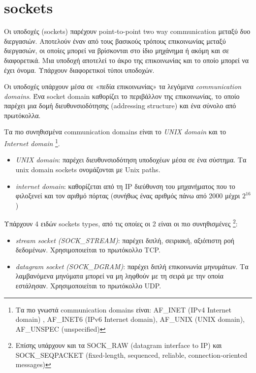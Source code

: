 


\section*{sockets}

Οι υποδοχές (sockets) παρέχουν point-to-point two way communication μεταξύ δυο διεργασιών. Αποτελούν έναν από τους βασικούς τρόπους
επικοινωνίας μεταξύ διεργασιών, οι οποίες μπορεί να βρίσκονται στο ίδιο μηχάνημα ή ακόμη και σε διαφορετικά. Μια υποδοχή αποτελεί το άκρο
της επικοινωνίας και το οποίο μπορεί να έχει όνομα. Υπάρχουν διαφορετικοί τύποι υποδοχών.

Οι υποδοχές υπάρχουν μέσα σε «πεδία επικοινωνίας» τα λεγόμενα \emph{communication domains}. Ένα socket domain καθορίζει το περιβάλλον της
επικοινωνίας, το οποίο παρέχει μια δομή διευθυνσιοδότησης (addressing structure) και ένα σύνολο από πρωτόκολλα.

Τα πιο συνηθισμένα communication domains είναι το \emph{UNIX domain} και το \emph{Internet domain} \footnote{Τα πιο γνωστά communication
	domains είναι: AF\_INET (IPv4 Internet domain) , AF\_INET6 (IPv6 Internet domain), AF\_UNIX (UNIX domain), AF\_UNSPEC (unspecified)}.

\begin{itemize}
	\item \emph{UNIX domain}: παρέχει διευθυνσιοδότηση υποδοχέων μέσα σε ένα σύστημα. Τα unix domain sockets ονομάζονται με Unix paths. 
	\item \emph{internet domain}: καθορίζεται από τη IP διεύθυνση του μηχανήματος που το φιλοξενεί και τον αριθμό πόρτας (συνήθως ένας αριθμός
	πάνω από 2000 μέχρι $2^{16}$) 
\end{itemize}

Υπάρχουν 4 ειδών sockets types, από τις οποίες οι 2 είναι οι πιο συνηθισμένες \footnote{Επίσης υπάρχουν και τα SOCK\_RAW (datagram interface
	to IP) και SOCK\_SEQPACKET (fixed-length, sequenced, reliable, connection-oriented messages)}:
\begin{itemize}
	\item \emph{stream socket (SOCK\_STREAM)}: παρέχει διπλή, σειριακή, αξιόπιστη ροή δεδομένων. Χρησιμοποιείται το πρωτόκολλο TCP.
	\item \emph{datagram socket (SOCK\_DGRAM)}: παρέχει διπλή επικοινωνία μηνυμάτων. Τα λαμβανόμενα μηνύματα μπορεί να μη ληφθούν με τη σειρά
	με την οποία εστάλησαν. Χρησιμοποιείται το πρωτόκολλο UDP. 
\end{itemize}

